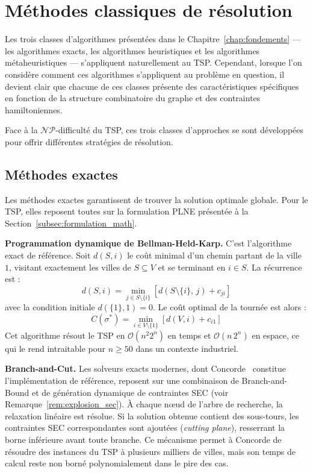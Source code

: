 \documentclass[12pt, a4paper, twoside, openright]{book}
\begin{document}
	\section{M\'ethodes classiques de r\'esolution}
	\label{sec:tsp_methodes}
Les trois classes d'algorithmes présentées dans le Chapitre~\ref{chap:fondements} --- les algorithmes exacts, les algorithmes heuristiques et les algorithmes métaheuristiques --- s'appliquent naturellement au TSP. Cependant, lorsque l'on considère comment ces algorithmes s'appliquent au problème en question, il devient clair que chacune de ces classes présente des caractéristiques spécifiques en fonction de la structure combinatoire du graphe et des contraintes hamiltoniennes.

Face à la $\mathcal{NP}$-difficulté du TSP, ces trois classes d'approches se sont développées pour offrir différentes stratégies de résolution.
	\subsection{M\'ethodes exactes}
	\label{subsec:tsp_exactes}
	
	Les méthodes exactes garantissent de trouver la solution optimale globale.
	Pour le TSP, elles reposent toutes sur la formulation PLNE présentée à la
	Section~\ref{subsec:formulation_math}.
	
	\textbf{Programmation dynamique de Bellman-Held-Karp.}
	C'est l'algorithme exact de référence. Soit $d(S, i)$ le coût minimal d'un
	chemin partant de la ville $1$, visitant exactement les villes de
	$S \subseteq V$ et se terminant en $i \in S$. La récurrence est :
	$$
	d(S, i) = \min_{j \in S \setminus \{i\}} \left[ d(S \setminus \{i\},\, j)
	+ c_{ji} \right]
	$$
	avec la condition initiale $d(\{1\}, 1) = 0$. Le coût optimal de la tournée
	est alors :
	$$
	C(\sigma^*) = \min_{i \in V \setminus \{1\}}
	\left[ d(V, i) + c_{i1} \right]
	$$
	Cet algorithme résout le TSP en $\mathcal{O}(n^2 2^n)$ en temps et
	$\mathcal{O}(n\, 2^n)$ en espace, ce qui le rend intraitable pour
	$n \geq 50$ dans un contexte industriel.
	
	\textbf{Branch-and-Cut.}
	Les solveurs exacts modernes, dont Concorde~\cite{applegate2006traveling} constitue l'implémentation de
	référence, reposent sur une combinaison de Branch-and-Bound et de génération
	dynamique de contraintes SEC (voir Remarque~\ref{rem:explosion_sec}). À
	chaque n\oe{}ud de l'arbre de recherche, la relaxation linéaire est résolue.
	Si la solution obtenue contient des sous-tours, les contraintes SEC
	correspondantes sont ajoutées (\textit{cutting plane}), resserrant la borne
	inférieure avant toute branche. Ce mécanisme permet à Concorde de résoudre
	des instances du TSP à plusieurs milliers de villes, mais son temps de calcul
	reste non borné polynomialement dans le pire des cas.
	
\end{document}
